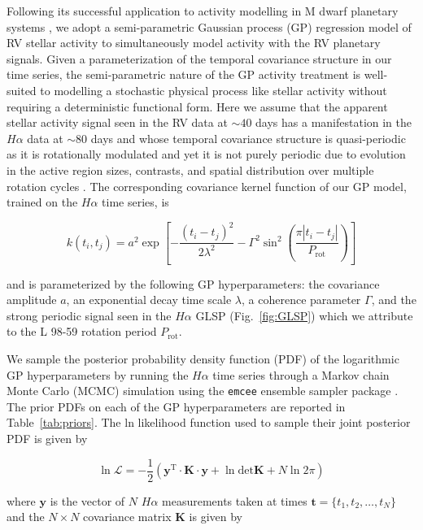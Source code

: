 \documentclass[longauth]{aa}
\newcommand{\prot}{$P_{\text{rot}}$}
\begin{document}
Following its successful application to activity modelling in M dwarf planetary systems \citep[e.g.][]{astudillodefru17c,cloutier17b,bonfils18,cloutier19,ment19}, we adopt a semi-parametric Gaussian process (GP) regression model of RV stellar activity to simultaneously model activity with the RV planetary signals. Given a parameterization of the temporal covariance structure in our time series, the semi-parametric nature of the GP activity treatment is well-suited to modelling a stochastic physical process like stellar activity without requiring a deterministic functional form. Here we assume that the apparent stellar activity signal seen in the RV data at $\sim 40$ days has a manifestation in the $H\alpha$ data at $\sim 80$ days and whose temporal covariance structure is quasi-periodic as it is rotationally modulated and yet it is not purely periodic due to evolution in the active region sizes, contrasts, and spatial distribution over multiple rotation cycles \citep{giles17}. The corresponding covariance kernel function of our GP model, trained on the $H\alpha$ time series, is 

\begin{equation}
    k(t_i,t_j) = a^2 \exp{\left[ -\frac{(t_i-t_j)^2}{2\lambda^2} -\Gamma^2 \sin^2{\left( \frac{\pi |t_i-t_j|}{P_{\text{rot}}} \right)} \right]}
    \label{eq:kernel}
\end{equation}

\noindent and is parameterized by the following GP hyperparameters: the covariance amplitude $a$, an exponential decay time scale $\lambda$, a coherence parameter $\Gamma$, and the strong periodic signal seen in the $H\alpha$ GLSP (Fig.~\ref{fig:GLSP}) which we attribute to the L 98-59 rotation period \prot{.} 

We sample the posterior probability density function (PDF) of the logarithmic GP hyperparameters by running the $H\alpha$ time series through a Markov chain Monte Carlo (MCMC) simulation using the \texttt{emcee} ensemble sampler package \citep{foremanmackey13}. The prior PDFs on each of the GP hyperparameters are reported in Table~\ref{tab:priors}. The ln likelihood function used to sample their joint posterior PDF is given by 

\begin{equation}
    \ln{\mathcal{L}} = -\frac{1}{2} \left( \mathbf{y}^{\text{T}}\cdot \mathbf{K}\cdot \mathbf{y} + \ln{\text{det}\mathbf{K}} + N\ln{2\pi} \right)
\end{equation}

\noindent where $\textbf{y}$ is the vector of $N$ $H\alpha$ measurements taken at times $\mathbf{t}=\{t_1,t_2,\dots,t_N \}$ and the $N \times N$ covariance matrix $\mathbf{K}$ is given by
\end{document}
